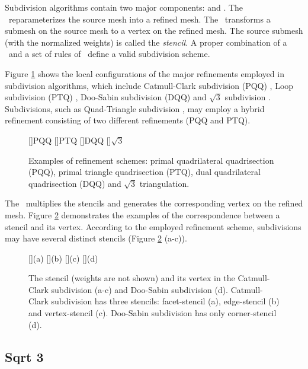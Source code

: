 Subdivision algorithms contain two major
components: \emph{\tr} and \emph{\gm}.
The \tr\ reparameterizes the source mesh into a refined 
mesh. The \gm\ transforms a submesh on the source mesh
to a vertex on the refined mesh. The source submesh (with
the normalized weights) is called the
\emph{stencil}. A proper combination of a \tr\ and a set of 
rules of \gm\ define a valid subdivision scheme.

Figure \ref{fig:RefSchemes} shows the local configurations 
of the major refinements
employed in subdivision algorithms, which include Catmull-Clark
subdivision (PQQ) \cite{cc}, Loop subdivision (PTQ) \cite{loop},
Doo-Sabin subdivision (DQQ) \cite{ds} and $\sqrt{3}$ subdivision
\cite{sqrt3}. Subdivisions, such as Quad-Triangle subdivision 
\cite{qts,l-pg-03}, may employ a hybrid refinement consisting
of two different refinements (PQQ and PTQ).
\begin{figure}
  \centering
  []{\scriptsize PQQ} 
  []{\scriptsize PTQ}
  []{\scriptsize DQQ} 
  []{\scriptsize $\sqrt{3}$} 
  \caption{Examples of refinement schemes: 
    primal quadrilateral quadrisection (PQQ),
    primal triangle quadrisection (PTQ),
    dual quadrilateral quadrisection (DQQ) and
    $\sqrt{3}$ triangulation.}
  \label{fig:RefSchemes}
\end{figure}
The \gm\ multiplies the stencils and
generates the corresponding vertex on the refined mesh.
Figure \ref{fig:RefMap} demonstrates the examples of the
correspondence between a stencil and its vertex. According 
to the employed refinement scheme, subdivisions 
may have several distinct stencils 
(Figure \ref{fig:RefMap} (a-c)). 
\begin{figure}
  \centering
  []{(a)}
  []{(b)}
  []{(c)}
  []{(d)}
  \caption{The stencil (weights are not shown) and its 
           vertex in the Catmull-Clark subdivision (a-c)
           and Doo-Sabin subdivision (d). Catmull-Clark
           subdivision has three stencils: facet-stencil (a), 
           edge-stencil (b) and vertex-stencil (c). 
           Doo-Sabin subdivision has only corner-stencil (d).}
  \label{fig:RefMap}
\end{figure}




\subsection{Sqrt 3}


%

